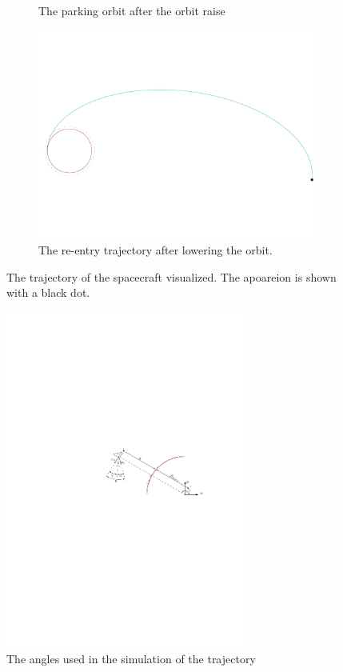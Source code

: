 \begin{figure}
\begin{subfigure}[b]{0.7\textwidth}
		\vspace{-15mm}
		\caption{The parking orbit after the orbit raise}
		\label{fig:parking_trajectory}
	\end{subfigure}
	\begin{subfigure}[b]{0.7\textwidth}
		\vspace{-22mm}
		\includegraphics[width=\textwidth]{./Figure/Orbit/re-entry_trajectory.pdf}
		\vspace{-25mm}
		\caption{The re-entry trajectory after lowering the orbit.}
		\label{fig:re_entry_trajectory}
	\end{subfigure}
	\caption{The trajectory of the spacecraft visualized. The apoareion is shown with a black dot.}
	\label{fig:trajectory}
\end{figure}

\begin{figure}[h]
	\centering
	\includegraphics[width=0.7\textwidth]{Figure/Orbit/angles.pdf}
	\caption{The angles used in the simulation of the trajectory}
	\label{fig:angles}
\end{figure}

